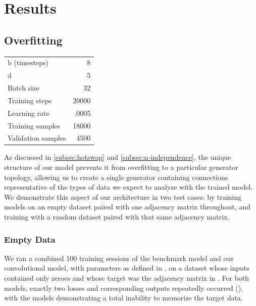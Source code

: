 \graphicspath{ {resources/models/3neurEx/} {resources/models/3neurEx/weights/} } 

\chapter{Results}
\label{results}
\section{Overfitting}
\label{sec:overfitting}
\setlength{\columnsep}{20pt}
\begin{table}
	\captionsetup{justification=centering}
	\vspace{-20pt}
	\begin{tabular}{lr}
		b (timesteps) & 8\\
		d& 5\\
		Batch size& 32\\
		Training steps& 20000\\
		Learning rate& .0005\\
		Training samples& 18000\\
		Validation samples& 4500
	\end{tabular}
	\vspace{-5pt}
	\label{fig:nullparams}
\end{table}
As discussed in \ref{subsec:hotswap} and \ref{subsec:n-independence}, the unique 
structure of our model prevents it from overfitting to a particular generator 
topology, allowing us to create a single generator containing connections 
representative of the types of data we expect to analyze with the trained model.
We demonstrate this aspect of our architecture in two test cases: by training 
models on an empty dataset paired with one adjacency matrix throughout, and 
training with a random dataset paired with that same adjacency matrix.

\subsection{Empty Data}
\label{subsec:empty}
We ran a combined 100 training sessions of the benchmark model and our 
convolutional model, with parameters as defined in , on a 
dataset whose inputs contained only zeroes and whose target was the adjacency 
matrix in . For both models, exactly two losses 
and corresponding outputs repeatedly occurred (), with 
the models demonstrating a total inability to memorize the target data.

